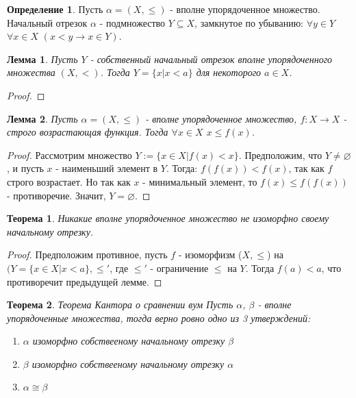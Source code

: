 \documentclass[a4paper, 12pt]{article}
\theoremstyle{definition}
\newtheorem*{definition}{Определение}
\theoremstyle{plain}
\newtheorem*{theorem}{Теорема}
\newtheorem*{lemma}{Лемма}
\theoremstyle{remark}
\begin{document}
  \begin{definition}
    Пусть $\alpha=(X,\leqslant)$ - вполне упорядоченное множество. Начальный отрезок $\alpha$ - подмножество $Y\subseteq X$, замкнутое по убыванию: $\forall y\in Y$ $\forall x\in X$ $(x<y\to x\in Y)$.
  \end{definition}
  \begin{lemma}
    Пусть $Y$ - собственный начальный отрезок вполне упорядоченного множества $(X,<)$. Тогда $Y=\{x|x<a\}$ для некоторого $a\in X$.
  \end{lemma}
  \begin{proof}
    
  \end{proof}
  \begin{lemma}
    Пусть $\alpha=(X,\leqslant)$ - вполне упорядоченное множество, $f:X\to X$ - строго возрастающая функция. Тогда $\forall x\in X$ $x\leqslant f(x)$.
  \end{lemma}
  \begin{proof}
    Рассмотрим множество $Y:=\{x\in X|f(x)<x\}$. Предположим, что $Y\neq\varnothing$, и пусть $x$ - наименьший элемент в $Y$. Тогда: $f(f(x))<f(x)$, так как $f$ строго возрастает. Но так как $x$ - минимальный элемент, то $f(x)\leqslant f(f(x))$ - противоречие. Значит, $Y=\varnothing$.
  \end{proof}
  \begin{theorem}
    Никакие вполне упорядоченное множество не изоморфно своему начальному отрезку.
  \end{theorem}
  \begin{proof}
    Предположим противное, пусть $f$ - изоморфизм ($X,\leqslant$) на $(Y=\{x\in X|x < a\},\leqslant'$, где $\leqslant'$ - ограничение $\leqslant$ на $Y$. Тогда $f(a)<a$, что противоречит предыдущей лемме.
  \end{proof}
  \begin{theorem}{Теорема Кантора о сравнении вум}
    Пусть $\alpha$, $\beta$ - вполне упорядоченные множества, тогда верно ровно одно из 3 утверждений:
    \begin{enumerate}
      \item $\alpha$ изоморфно собствееному начальному отрезку $\beta$
      \item $\beta$ изоморфно собствееному начальному отрезку $\alpha$
      \item $\alpha\cong\beta$
    \end{enumerate}
  \end{theorem}
\end{document}
